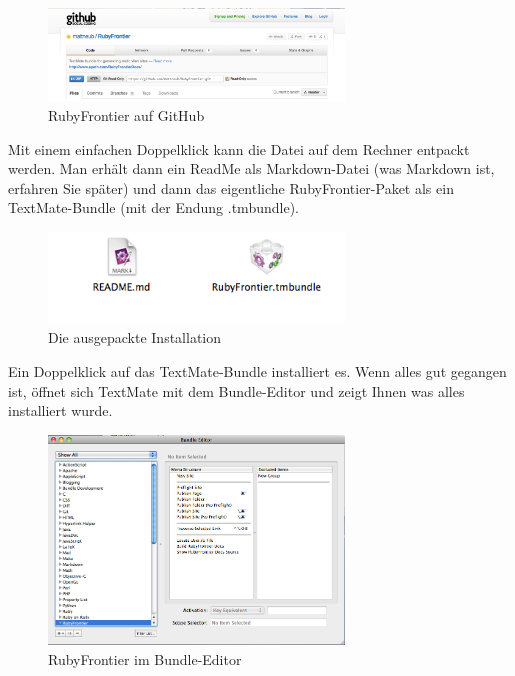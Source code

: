 \documentclass[11pt]{report}
\begin{document}
\begin{figure}[h!]
\centering
\includegraphics[width=0.7\textwidth]{./images/rubyfrontier-github.png}
\caption{\label{rubyfrontier-github}RubyFrontier auf GitHub}
\end{figure}


Mit einem einfachen Doppelklick kann die Datei auf dem Rechner entpackt werden. Man erhält dann ein ReadMe als Markdown-Datei (was Markdown ist, erfahren Sie später) und dann das eigentliche RubyFrontier-Paket als ein TextMate-Bundle (mit der Endung .tmbundle).

\begin{figure}[h!]
\centering
\includegraphics[width=0.7\textwidth]{./images/rubyfrontier-tmbundle.png}
\caption{\label{rubyfrontier-tmbundle}Die ausgepackte Installation}
\end{figure}

Ein Doppelklick auf das TextMate-Bundle installiert es. Wenn alles gut gegangen ist, öffnet sich TextMate mit dem Bundle-Editor und zeigt Ihnen was alles installiert wurde.

\begin{figure}[h!]
\centering
\includegraphics[width=0.7\textwidth]{./images/ruby-frontier-bundle-editor.png}
\caption{\label{ruby-frontier-bundle-editor}RubyFrontier im Bundle-Editor}
\end{figure}
\end{document}
